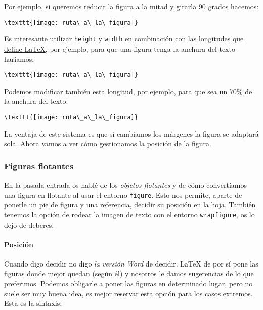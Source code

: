 Por ejemplo, si queremos reducir la figura a la mitad y girarla 90
grados hacemos:

\begin{lstlisting}[language={[latex]tex}]
\texttt{[image: ruta\_a\_la\_figura]}
\end{lstlisting}

Es interesante utilizar \lstinline!height! y \lstinline!width! en
combinación con las
\href{https://en.wikibooks.org/wiki/LaTeX/Lengths}{longitudes que define
LaTeX}, por ejemplo, para que una figura tenga la anchura del texto
haríamos:

\begin{lstlisting}[language={[latex]tex}]
\texttt{[image: ruta\_a\_la\_figura]}
\end{lstlisting}

Podemos modificar también esta longitud, por ejemplo, para que sea un
70\% de la anchura del texto:

\begin{lstlisting}[language={[latex]tex}]
\texttt{[image: ruta\_a\_la\_figura]}
\end{lstlisting}

La ventaja de este sistema es que si cambiamos los márgenes la figura se
adaptará sola. Ahora vamos a ver cómo gestionamos la posición de la
figura.

\subsubsection{Figuras flotantes}\label{sec:figFlotantes}

En la pasada entrada os hablé de los \emph{objetos flotantes} y de cómo
convertíamos una figura en flotante al usar el entorno
\lstinline!figure!. Esto nos permite, aparte de ponerle un pie de figura
y una referencia, decidir su posición en la hoja. También tenemos la
opción de
\href{http://texblog.org/2010/05/13/wrap-text-around-figures-and-tables/}{rodear
la imagen de texto} con el entorno \lstinline!wrapfigure!, os lo dejo de
deberes.

\paragraph{Posición}\label{sec:posicion}

Cuando digo decidir no digo \emph{la versión Word} de decidir. LaTeX de
por sí pone las figuras donde mejor quedan (según él) y nosotros le
damos sugerencias de lo que preferimos. Podemos obligarle a poner las
figuras en determinado lugar, pero no suele ser muy buena idea, es mejor
reservar esta opción para los casos extremos. Esta es la sintaxis:

